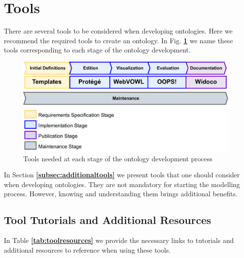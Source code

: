 \documentclass{guideline/sty/rapport}
\begin{document}
\newpage
\section{Tools}
\label{sec:tools}
There are several tools to be considered when developing ontologies. Here we recommend the required tools to create an ontology. In Fig. \textbf{\ref{fig:toolstages}} we name these tools corresponding to each stage of the ontology development. \singlespacing

    \begin{figure}[H]
        \centering
          \includegraphics[width=1\textwidth]{images/Tools-Stages.pdf}
          \caption{Tools needed at each stage of the ontology development process}
        \label{fig:toolstages}
    \end{figure}
    
\begin{beware}[Remark]
In Section \textbf{\ref{subsec:additionaltools}} we present tools that one should consider when developing ontologies. They are not mandatory for starting the modelling process. However, knowing and understanding them brings additional benefits.
\end{beware}

\subsection{Tool Tutorials and Additional Resources}
In Table \textbf{\ref{tab:toolresources}} we provide the necessary links to tutorials and additional resources to reference when using these tools.
    
\end{document}
